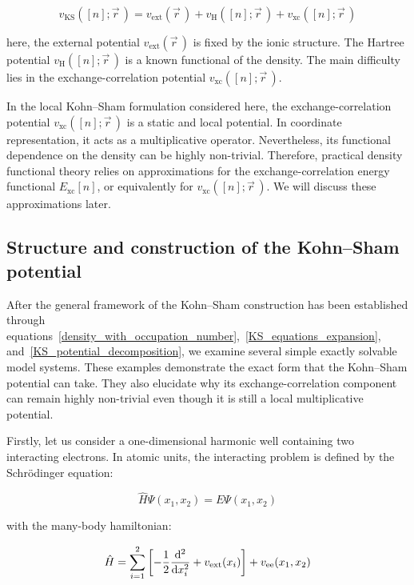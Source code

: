 \begin{equation}
    v_\mathrm{KS}([n];\vec{r}\,)
    = v_\mathrm{ext}(\vec{r}\,)
    + v_\mathrm{H}([n];\vec{r}\,)
    + v_\mathrm{xc}([n];\vec{r}\,)
\label{KS_potential_decomposition}
\end{equation}

here, the external potential $v_\mathrm{ext}(\vec{r}\,)$ is fixed by the ionic structure.
The Hartree potential $v_\mathrm{H}([n];\vec{r}\,)$ is a known functional of the density.
The main difficulty lies in the exchange-correlation potential $v_\mathrm{xc}([n];\vec{r}\,)$.

In the local Kohn--Sham formulation considered here, the exchange-correlation potential $v_\mathrm{xc}([n];\vec{r}\,)$ is a static and local potential.
In coordinate representation, it acts as a multiplicative operator.
Nevertheless, its functional dependence on the density can be highly non-trivial.
Therefore, practical density functional theory relies on approximations for the exchange-correlation energy functional $E_\mathrm{xc}[n]$,
or equivalently for $v_\mathrm{xc}([n];\vec{r}\,)$.
We will discuss these approximations later.

\subsection{Structure and construction of the Kohn--Sham potential}

After the general framework of the Kohn--Sham construction has been established through equations~\eqref{density_with_occupation_number},~\eqref{KS_equations_expansion}, and~\eqref{KS_potential_decomposition},
we examine several simple exactly solvable model systems.
These examples demonstrate the exact form that the Kohn--Sham potential can take.
They also elucidate why its exchange-correlation component can remain highly non-trivial even though it is still a local multiplicative potential.

Firstly, let us consider a one-dimensional harmonic well containing two interacting electrons.
In atomic units, the interacting problem is defined by the Schrödinger equation:

\begin{equation}
    \hat{H}\Psi(x_1,x_2)=E\Psi(x_1,x_2)
\label{interacting_Schrodinger_equation_1D_two_electrons}
\end{equation}

with the many-body hamiltonian:

\begin{equation}
    \hat{H}
    = \sum_{i=1}^{2}\left[-\frac{1}{2}\frac{\mathrm{d}^2}{\mathrm{d} x_i^2}+v_\mathrm{ext}(x_i)\right]
    + v_\mathrm{ee}(x_1,x_2)
\label{interacting_hamiltonian_1D_two_electrons}
\end{equation}

